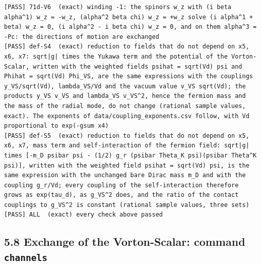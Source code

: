 \documentclass[
  10pt,
]{article}
\begin{document}
\begin{verbatim}
[PASS] 71d-V6  (exact) winding -1: the spinors w_z with (i beta alpha^1) w_z = -w_z, (alpha^2 beta chi) w_z = +w_z solve (i alpha^1 + beta) w_z = 0, (i alpha^2 - i beta chi) w_z = 0, and on them alpha^3 = -Pc: the directions of motion are exchanged
[PASS] def-S4  (exact) reduction to fields that do not depend on x5, x6, x7: sqrt|g| times the Yukawa term and the potential of the Vorton-Scalar, written with the weighted fields psihat = sqrt(Vd) psi and Phihat = sqrt(Vd) Phi_VS, are the same expressions with the couplings y_VS/sqrt(Vd), lambda_VS/Vd and the vacuum value v_VS sqrt(Vd); the products y_VS v_VS and lambda_VS v_VS^2, hence the fermion mass and the mass of the radial mode, do not change (rational sample values, exact). The exponents of data/coupling_exponents.csv follow, with Vd proportional to exp(-gsum x4)
[PASS] def-S5  (exact) reduction to fields that do not depend on x5, x6, x7, mass term and self-interaction of the fermion field: sqrt|g| times [-m_D psibar psi - (1/2) g_r (psibar Theta_K psi)(psibar Theta^K psi)], written with the weighted field psihat = sqrt(Vd) psi, is the same expression with the unchanged bare Dirac mass m_D and with the coupling g_r/Vd; every coupling of the self-interaction therefore grows as exp(tau_d), as g_VS^2 does, and the ratio of the contact couplings to g_VS^2 is constant (rational sample values, three sets)
[PASS] ALL  (exact) every check above passed
\end{verbatim}

\hypertarget{exchange-of-the-vorton-scalar-command-channels}{%
\subsection{\texorpdfstring{5.8 Exchange of the Vorton-Scalar: command
\texttt{channels}}{5.8 Exchange of the Vorton-Scalar: command channels}}\label{exchange-of-the-vorton-scalar-command-channels}}
\end{document}
